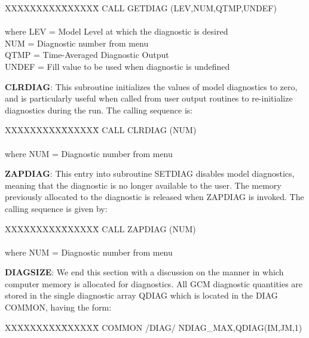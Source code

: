 \begin{tabbing}
XXXXXXXXX\=XXXXXX\= \kill
\>        CALL GETDIAG (LEV,NUM,QTMP,UNDEF) \\
\\
where \>  LEV   \>= Model Level at which the diagnostic is desired \\
      \>  NUM   \>= Diagnostic number from menu \\
      \>  QTMP  \>= Time-Averaged Diagnostic Output \\
      \>  UNDEF \>= Fill value to be used when diagnostic is undefined \\
\end{tabbing}

{\bf CLRDIAG}:  This subroutine initializes the values of model diagnostics to zero, and is
particularly useful when called from user output routines to re-initialize diagnostics during the
run.  The calling sequence is:


\begin{tabbing}
XXXXXXXXX\=XXXXXX\= \kill
\>        CALL CLRDIAG (NUM) \\
\\
where \>  NUM   \>= Diagnostic number from menu \\
\end{tabbing}



{\bf ZAPDIAG}:  This entry into subroutine SETDIAG disables model diagnostics, meaning that the
diagnostic is no longer available to the user.  The memory previously allocated to the diagnostic
is released when ZAPDIAG is invoked.  The calling sequence is given by:


\begin{tabbing}
XXXXXXXXX\=XXXXXX\= \kill
\>        CALL ZAPDIAG (NUM) \\
\\
where \>  NUM   \>= Diagnostic number from menu \\
\end{tabbing}

{\bf DIAGSIZE}:  We end this section with a discussion on the manner in which computer memory   
is allocated for diagnostics.   
All GCM diagnostic quantities are stored in the single
diagnostic array QDIAG which is located in the DIAG COMMON, having the form:

\begin{tabbing}
XXXXXXXXX\=XXXXXX\= \kill
\>        COMMON /DIAG/ NDIAG\_MAX,QDIAG(IM,JM,1) \\
\\
\end{tabbing}

